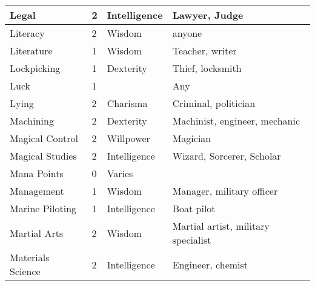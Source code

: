 \documentclass[twoside]{book}
\begin{document}
\begin{longtable}{p{1.25in}llp{12em}}
  \raggedright
           Legal 
  &
   2 
  &
   Intelligence 
  &
   Lawyer, Judge 
  \tabularnewline
  \hline
      
  \raggedright
           Literacy 
  &
   2 
  &
   Wisdom 
  &
   anyone 
  \tabularnewline
  \hline
      
  \raggedright
           Literature 
  &
   1 
  &
   Wisdom 
  &
   Teacher, writer 
  \tabularnewline
  \hline
      
  \raggedright
           Lockpicking 
  &
   1 
  &
   Dexterity 
  &
   Thief, locksmith 
  \tabularnewline
  \hline
      
  \raggedright
           Luck 
  &
   1 
  &
    
  &
   Any 
  \tabularnewline
  \hline
      
  \raggedright
           Lying 
  &
   2 
  &
   Charisma 
  &
   Criminal, politician
           
  \tabularnewline
  \hline
      
  \raggedright
           Machining 
  &
   2 
  &
   Dexterity 
  &
   Machinist, engineer,
           mechanic 
  \tabularnewline
  \hline
      
  \raggedright
           Magical Control 
  &
   2 
  &
   Willpower 
  &
   Magician 
  \tabularnewline
  \hline
      
  \raggedright
           Magical Studies 
  &
   2 
  &
   Intelligence 
  &
   Wizard, Sorcerer, Scholar
           
  \tabularnewline
  \hline
      
  \raggedright
           Mana Points 
  &
   0 
  &
   Varies 
  &
  
  \tabularnewline
  \hline
      
  \raggedright
           Management 
  &
   1 
  &
   Wisdom 
  &
   Manager, military officer
           
  \tabularnewline
  \hline
      
  \raggedright
           Marine Piloting 
  &
   1 
  &
   Intelligence 
  &
   Boat pilot 
  \tabularnewline
  \hline
      
  \raggedright
           Martial Arts 
  &
   2 
  &
   Wisdom 
  &
   Martial artist, military
           specialist 
  \tabularnewline
  \hline
      
  \raggedright
           Materials Science 
  &
   2 
  &
   Intelligence 
  &
   Engineer, chemist
           
  \tabularnewline
  \hline
      

\end{longtable}
\end{document}
